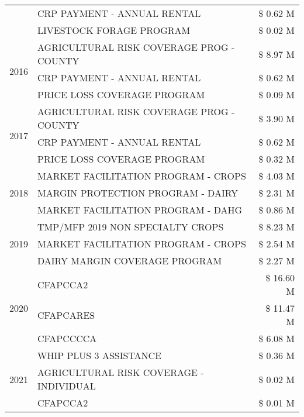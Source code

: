 \begin{tabular}{llr}
 & CRP PAYMENT - ANNUAL RENTAL & \$ 0.62 M \\
 & LIVESTOCK FORAGE PROGRAM & \$ 0.02 M \\
\cline{1-3}
\multirow[t]{3}{*}{2016} & AGRICULTURAL RISK COVERAGE PROG - COUNTY & \$ 8.97 M \\
 & CRP PAYMENT - ANNUAL RENTAL & \$ 0.62 M \\
 & PRICE LOSS COVERAGE PROGRAM & \$ 0.09 M \\
\cline{1-3}
\multirow[t]{3}{*}{2017} & AGRICULTURAL RISK COVERAGE PROG - COUNTY & \$ 3.90 M \\
 & CRP PAYMENT - ANNUAL RENTAL & \$ 0.62 M \\
 & PRICE LOSS COVERAGE PROGRAM & \$ 0.32 M \\
\cline{1-3}
\multirow[t]{3}{*}{2018} & MARKET FACILITATION PROGRAM - CROPS & \$ 4.03 M \\
 & MARGIN PROTECTION PROGRAM - DAIRY & \$ 2.31 M \\
 & MARKET FACILITATION PROGRAM - DAHG & \$ 0.86 M \\
\cline{1-3}
\multirow[t]{3}{*}{2019} & TMP/MFP 2019 NON SPECIALTY CROPS & \$ 8.23 M \\
 & MARKET FACILITATION PROGRAM - CROPS & \$ 2.54 M \\
 & DAIRY MARGIN COVERAGE PROGRAM & \$ 2.27 M \\
\cline{1-3}
\multirow[t]{3}{*}{2020} & CFAPCCA2 & \$ 16.60 M \\
 & CFAPCARES & \$ 11.47 M \\
 & CFAPCCCCA & \$ 6.08 M \\
\cline{1-3}
\multirow[t]{3}{*}{2021} & WHIP PLUS 3 ASSISTANCE & \$ 0.36 M \\
 & AGRICULTURAL RISK COVERAGE - INDIVIDUAL & \$ 0.02 M \\
 & CFAPCCA2 & \$ 0.01 M \\
\cline{1-3}
\bottomrule
\end{tabular}
